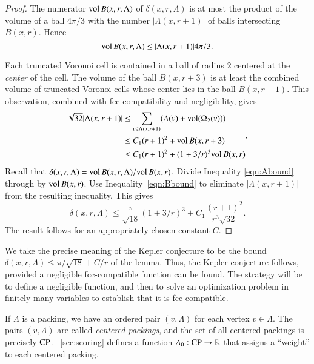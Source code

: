 \begin{proof}
The numerator ${\operatorname{vol}}\, B(x,r,\Lambda)$ of $\delta(x,r,\Lambda)$
is at most the product of the volume of a ball $4\pi/3$ with the
number $|\Lambda(x,r+1)|$ of balls intersecting $B(x,r)$.  Hence
    \begin{equation}
    {\operatorname{vol}}\, B(x,r,\Lambda) \le |\Lambda(x,r+1)| 4\pi/3.
    \label{eqn:Abound}
    \end{equation}

Each truncated Voronoi cell is contained in a ball of
radius $2$ centered at the {\it center} of the cell.  The volume
of the ball $B(x,r+3)$ is at least the combined volume of 
truncated Voronoi
cells whose center lies in the ball $B(x,r+1)$. This observation,
combined with fcc-compatibility and negligibility, gives
    \begin{equation}
    \begin{split}
    \sqrt{32}|\Lambda(x,r+1)|
    &\le \sum_{v\in\Lambda(x,r+1)} (A(v) +
    {\operatorname{vol}}(\Omega_2(v))) \\
    &\le C_1 (r+1)^2 + {\operatorname{vol}}\,B(x,r+3) \\
    &\le C_1 (r+1)^2 + (1+3/r)^3 {\operatorname{vol}}\,B(x,r)
    \label{eqn:Bbound}
    \end{split}.
    \end{equation}
Recall that $\delta(x,r,\Lambda)=
{\operatorname{vol}}\,B(x,r,\Lambda)/{\operatorname{vol}}\,B(x,r)$. Divide Inequality
\ref{eqn:Abound} through by ${\operatorname{vol}}\,B(x,r)$.  Use
Inequality~\ref{eqn:Bbound} to eliminate $|\Lambda(x,r+1)|$ from the
resulting inequality.  This gives
    $$\delta(x,r,\Lambda)
        \le \frac{\pi}{\sqrt{18}} (1+3/r)^3 + C_1 \frac{(r+1)^2}{r^3\sqrt{32}}.
    $$
The result follows for an appropriately chosen constant $C$.
\end{proof}

\begin{remark} \label{remark:precise}
We take the precise meaning of the Kepler conjecture to be the
bound $\delta(x,r,\Lambda) \le \pi/\sqrt{18} + C/r$ of the lemma.
Thus, the Kepler conjecture follows, provided a negligible
fcc-compatible function can be found. The strategy will be to
define a negligible function, and then to solve an optimization
problem in finitely many variables to establish that it is
fcc-compatible.
\end{remark}

If $\Lambda$ is a %
packing, we have an ordered pair
$(v,\Lambda)$ for each vertex $v\in\Lambda$.  The pairs
$(v,\Lambda)$ are called {\it centered packings}, and the
set of all centered packings is precisely ${\operatorname{CP}}$.
%
\Chap~\ref{sec:scoring} defines a function
$A_0:{\operatorname{CP}}\to\mathbb{R}$ that assigns a ``weight'' to each
centered packing.

